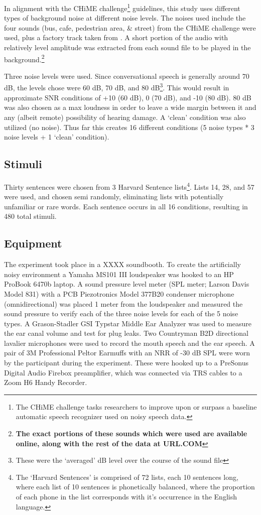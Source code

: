 \documentclass[dissertation,copyright]{uathesis}
\begin{document}
In alignment with the CHiME challenge\footnote{The CHiME challenge tasks researchers to improve upon or surpass a baseline automatic speech recognizer used on noisy speech data.} guidelines, this study uses different types of background noise at different noise levels.  The noises used include the four sounds (bus, cafe, pedestrian area, \& street) from the CHiME\cite{chimeURL:2016} challenge were used, plus a factory track taken from \cite{factoryURL}.  A short portion of the audio with relatively level amplitude was extracted from each sound file to be played in the background.\footnote{\textbf{The exact portions of these sounds which were used are available online, along with the rest of the data at URL.COM}}

Three noise levels were used.  Since conversational speech is generally around 70 dB, the levels chose were 60 dB, 70 dB, and 80 dB\footnote{These were the `averaged' dB level over the course of the sound file}.  This would result in approximate SNR conditions of +10 (60 dB), 0 (70 dB), and -10 (80 dB).  80 dB was also chosen as a max loudness in order to leave a wide margin between it and any (albeit remote) possibility of hearing damage. A `clean' condition was also utilized (no noise).  Thus far this creates 16 different conditions (5 noise types * 3 noise levels + 1 `clean' condition).  

\subsection{Stimuli}
Thirty sentences were chosen from 3 Harvard Sentence lists\footnote{The `Harvard Sentences' is comprised of 72 lists, each 10 sentences long, where each list of 10 sentences is phonetically balanced, where the proportion of each phone in the list corresponds with it's occurrence in the English language.\cite{harvardSentencesURL}}.  Lists 14, 28, and 57 were used, and chosen semi randomly, eliminating lists with potentially unfamiliar or rare words.  Each sentence occurs in all 16 conditions, resulting in 480 total stimuli.

  
\subsection{Equipment}

The experiment took place in a XXXX soundbooth.  To create the artificially noisy environment a Yamaha MS101 III loudspeaker was hooked to an HP ProBook 6470b laptop.  A sound pressure level meter (SPL meter; Larson Davis Model 831) with a PCB Piezotronics Model 377B20 condenser microphone (omnidirectional) was placed 1 meter from the loudspeaker and measured the sound pressure to verify each of the three noise levels for each of the 5 noise types. A Grason-Stadler GSI Typstar Middle Ear Analyzer was used to measure the ear canal volume and test for plug leaks.  Two Countryman B2D directional lavalier microphones were used to record the mouth speech and the ear speech.  A pair of 3M Professional Peltor Earmuffs with an NRR of -30 dB SPL were worn by the participant during the experiment.  These were hooked up to a PreSonus Digital Audio Firebox preamplifier, which was connected via TRS cables to a Zoom H6 Handy Recorder.
\end{document}
